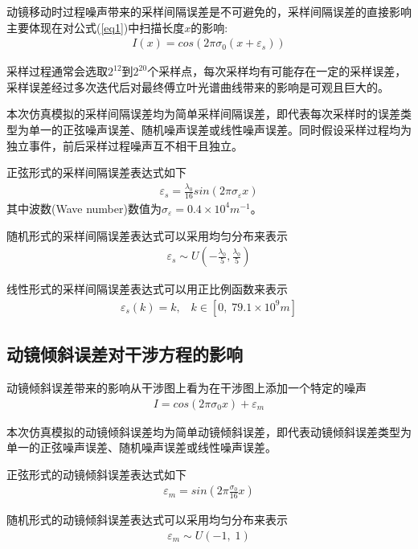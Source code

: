 \documentclass[conference]{IEEEtran}
\begin{document}
动镜移动时过程噪声带来的采样间隔误差是不可避免的，采样间隔误差的直接影响主要体现在对公式(\ref{eq1})中扫描长度$x$的影响:
\begin{align}
    I(x) = cos(2\pi\sigma_0(x + \varepsilon_s)) \label{eq9}
\end{align}

采样过程通常会选取$2^{12}$到$2^{20}$个采样点，每次采样均有可能存在一定的采样误差，采样误差经过多次迭代后对最终傅立叶光谱曲线带来的影响是可观且巨大的。

本次仿真模拟的采样间隔误差均为简单采样间隔误差，即代表每次采样时的误差类型为单一的正弦噪声误差、随机噪声误差或线性噪声误差。同时假设采样过程均为独立事件，前后采样过程噪声互不相干且独立。

正弦形式的采样间隔误差表达式如下
\begin{align}
    \varepsilon_s = \frac{\lambda_0}{16}sin(2\pi\sigma_{\varepsilon}x)  \label{eq2}
\end{align}
其中波数(Wave number)数值为$\sigma_{\varepsilon} = 0.4\times10^4 m^{-1}$。

随机形式的采样间隔误差表达式可以采用均匀分布来表示
\begin{align}
    \varepsilon_s \sim U(-\frac{\lambda_0}{5}, \frac{\lambda_0}{5})   \label{eq3}
\end{align}

线性形式的采样间隔误差表达式可以用正比例函数来表示
\begin{align}
    \varepsilon_s(k) = k, \;\;\; k \in [0, \;79.1\times10^9 m] \label{eq4}
\end{align}

\subsection{动镜倾斜误差对干涉方程的影响}
动镜倾斜误差带来的影响从干涉图上看为在干涉图上添加一个特定的噪声
\begin{align}
    I = cos(2\pi\sigma_0x) + \varepsilon_m \label{eq5}
\end{align}

本次仿真模拟的动镜倾斜误差均为简单动镜倾斜误差，即代表动镜倾斜误差类型为单一的正弦噪声误差、随机噪声误差或线性噪声误差。

正弦形式的动镜倾斜误差表达式如下
\begin{align}
    \varepsilon_m = sin(2\pi\frac{\sigma_0}{16}x)  \label{eq6}
\end{align}

随机形式的动镜倾斜误差表达式可以采用均匀分布来表示
\begin{align}
    \varepsilon_m \sim U(-1, \; 1)   \label{eq7}
\end{align}
\end{document}
